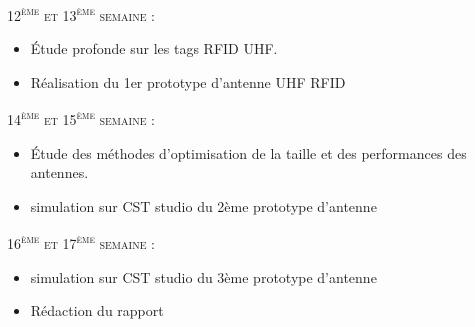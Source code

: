 \documentclass[11pt, a4paper, twoside]{book}
\begin{document}
\textsc{12\textsuperscript{ème} et 13\textsuperscript{ème} semaine :}
\begin{itemize}
\item Étude profonde sur les tags RFID UHF.
\item Réalisation du 1er prototype d'antenne UHF RFID
\end{itemize}
\textsc{14\textsuperscript{ème} et 15\textsuperscript{ème} semaine :}
\begin{itemize}
\item Étude des méthodes d'optimisation de la taille et des performances des antennes.
\item simulation sur CST studio du 2ème prototype d'antenne
\end{itemize}
\textsc{16\textsuperscript{ème} et 17\textsuperscript{ème} semaine :}
\begin{itemize}
\item simulation sur CST studio du 3ème prototype d'antenne
\item Rédaction du rapport\\\\\\\\\\\\\
\end{itemize}
\pagebreak
\end{document}
